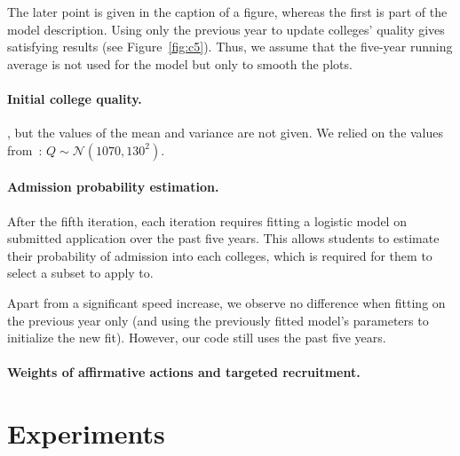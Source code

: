 The later point is given in the caption of a figure, whereas the first is part of the model description.
Using only the previous year to update colleges' quality gives satisfying results (see Figure~\ref{fig:c5}).
Thus, we assume that the five-year running average is not used for the model but only to smooth the plots.

\paragraph{Initial college quality.}

, but the values of the mean and variance are not given.
We relied on the values from~\cite{reardon2016agent}: $Q \sim \mathcal{N}(1070, 130^2)$.

\paragraph{Admission probability estimation.}

After the fifth iteration, each iteration requires fitting a logistic model on submitted application over the past five years. This allows students to estimate their probability of admission into each colleges, which is required for them to select a subset to apply to.

Apart from a significant speed increase, we observe no difference when fitting on the previous year only (and using the previously fitted model's parameters to initialize the new fit).
However, our code still uses the past five years.

\paragraph{Weights of affirmative actions and targeted recruitment.}



\section{Experiments}

